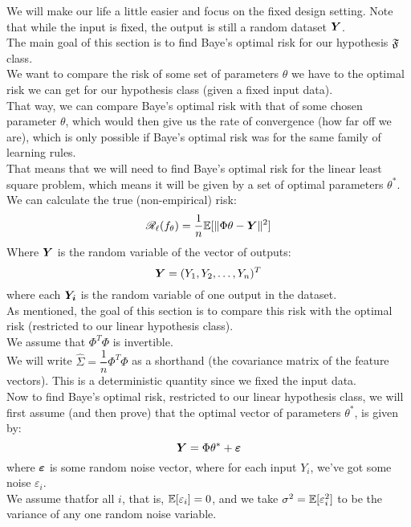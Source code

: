 \documentclass[12pt]{article}
\begin{document}
We will make our life a little easier and
focus on the fixed design setting.
Note that while the input is fixed,
the output is still a random dataset $\boldsymbol{Y}$. \\

The main goal of this section is to
find Baye's optimal risk for our hypothesis
$\mathfrak{F}$ class. \\
We want to compare the risk of some
set of parameters $\theta$ we have to
the optimal risk we can get
for our hypothesis class (given a fixed
input data). \\
That way, we can compare Baye's optimal risk
with that of some chosen parameter $\theta$,
which would then give us the rate of convergence
(how far off we are),
which is only possible if Baye's optimal risk
was for the same family of learning rules. \\
That means that we will need to find
Baye's optimal risk for the linear least square
problem, which means it will be given
by a set of optimal parameters $\theta^*$. \\

We can calculate the true (non-empirical)
risk:
\[ \mathscr{R}_{\ell}{}(f_\theta) = 
\dfrac{1}{n}\mathbb{E}[\|\Phi \theta - \boldsymbol{Y}\|^2] \]
Where $\boldsymbol{Y}$
is the random variable of the vector of outputs:
\[ \boldsymbol{Y} = (Y_1,Y_2, \dots, Y_n)^T \]
where each $\boldsymbol{Y_i}$
is the random variable of one output in the dataset. \\
As mentioned, the goal of this section
is to compare this risk with the optimal risk
(restricted to our linear hypothesis class). \\

We assume that $\Phi^T\Phi$ is invertible. \\

We will write $\hat{\Sigma} = \dfrac{1}{n}\Phi^T\Phi$
as a shorthand (the covariance matrix of the feature
vectors). This is a deterministic quantity since we
fixed the input data. \\

Now to find Baye's optimal risk,
restricted to our linear hypothesis class,
we will first assume (and then prove)
that the optimal vector of parameters $\theta^*$,
is given by:
\[ \boldsymbol{Y} = \Phi \theta^* + \boldsymbol{\varepsilon} \]
where $\boldsymbol{\varepsilon}$ is some random noise vector,
where for each input $Y_i$, 
we've got some noise $\varepsilon_i$. \\
We assume thatfor all $i$,
that is, $\mathbb{E}[\varepsilon_i] = 0$,
and we take $\sigma^2 = \mathbb{E}[\varepsilon_i^2]$
to be the variance of any one random noise variable. \\
\end{document}
